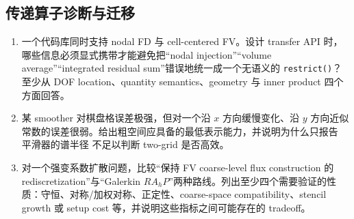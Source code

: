 \subsection*{传递算子诊断与迁移}
\begin{enumerate}[label=\arabic*.]
\item 一个代码库同时支持 nodal FD 与 cell-centered FV。设计 transfer API 时，哪些信息必须显式携带才能避免把“nodal injection”“volume average”“integrated residual sum”错误地统一成一个无语义的 \texttt{restrict()}？至少从 DOF location、quantity semantics、geometry 与 inner product 四个方面回答。

\item 某 smoother 对棋盘格误差极强，但对一个沿 $x$ 方向缓慢变化、沿 $y$ 方向近似常数的误差很弱。给出粗空间应具备的最低表示能力，并说明为什么只报告 平滑器的谱半径 不足以判断 two-grid 是否高效。

\item 对一个强变系数扩散问题，比较“保持 FV coarse-level flux construction 的 rediscretization”与“Galerkin $RA_hP$”两种路线。列出至少四个需要验证的性质：守恒、对称/加权对称、正定性、coarse-space compatibility、stencil growth 或 setup cost 等，并说明这些指标之间可能存在的 tradeoff。
\end{enumerate}
